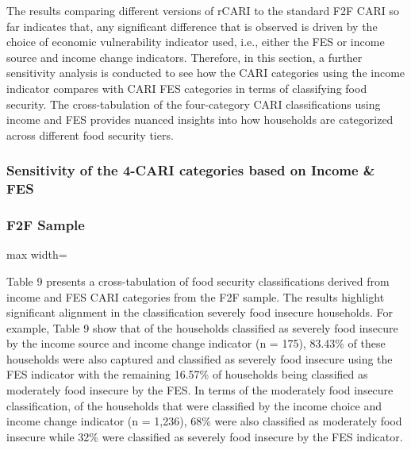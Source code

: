 \documentclass[11pt,harvard]{article}
\begin{document}
	The results comparing different versions of rCARI to the standard F2F CARI so far indicates that, any significant difference that is observed is driven by the choice of economic vulnerability indicator used, i.e., either the FES or income source and income change indicators. Therefore, in this section, a further sensitivity analysis is conducted to see how the CARI categories using the income indicator compares with CARI FES categories in terms of classifying food security. The cross-tabulation of the four-category CARI classifications using income and FES provides nuanced insights into how households are categorized across different food security tiers.
	
	\subsubsection{Sensitivity of the 4-CARI categories based on Income \& FES}
	\subsubsection*{F2F Sample}
	\begin{table}[htbp]
		\centering
		\begin{adjustbox}{max width=\textwidth}
			\begin{threeparttable}
				\caption{Cross Tabulation of CARI\_Income and CARI\_FES - F2F Sample}
				\scriptsize
				 
				\label{tab:BF_FS_Cat_Cross_Tabulation}
			\end{threeparttable}
		\end{adjustbox}
	\end{table}
	
	Table 9 presents a cross-tabulation of food security classifications derived from income and FES CARI categories from the F2F sample. The results highlight significant alignment in the classification severely food insecure households. For example, Table 9 show that of the households classified as severely food insecure by the income source and income change indicator (n = 175), 83.43\% of these households were also captured and classified as severely food insecure using the FES indicator with the remaining 16.57\% of households being classified as moderately food insecure by the FES. In terms of the moderately food insecure classification, of the households that were classified by the income choice and income change indicator (n = 1,236), 68\% were also classified as moderately food insecure while 32\% were classified as severely food insecure by the FES indicator. 
	
\end{document}
